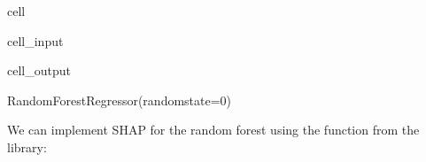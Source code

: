 \documentclass[letterpaper,10pt,english]{jupyterBook}
\begin{document}
\begin{sphinxuseclass}{cell}\begin{sphinxVerbatimInput}

\begin{sphinxuseclass}{cell_input}
\begin{sphinxVerbatim}[commandchars=\\\{\}]
   

  \PYG{p}{[}\PYG{p}{[}  \PYG{p}{]}\PYG{p}{]}
  \PYG{p}{[}\PYG{p}{]}

   
 
\end{sphinxVerbatim}

\end{sphinxuseclass}\end{sphinxVerbatimInput}
\begin{sphinxVerbatimOutput}

\begin{sphinxuseclass}{cell_output}
\begin{sphinxVerbatim}[commandchars=\\\{\}]
RandomForestRegressor(random\PYGZus{}state=0)
\end{sphinxVerbatim}

\end{sphinxuseclass}\end{sphinxVerbatimOutput}

\end{sphinxuseclass}
\sphinxAtStartPar
We can implement SHAP for the random forest using the  function from the  library:
\end{document}
